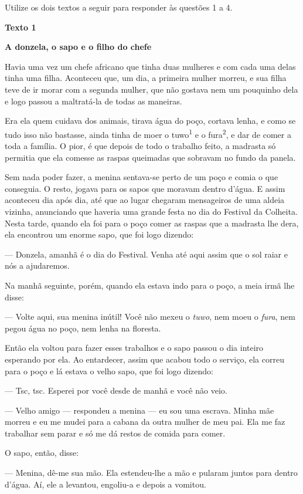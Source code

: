 Utilize os dois textos a seguir para responder às questões 1 a 4.

\textbf{Texto 1}

\textbf{A donzela, o sapo e o filho do chefe}

Havia uma vez um chefe africano que tinha duas mulheres e com cada uma
delas tinha uma filha. Aconteceu que, um dia, a primeira mulher morreu,
e sua filha teve de ir morar com a segunda mulher, que não gostava nem
um pouquinho dela e logo passou a maltratá-la de todas as maneiras.

Era ela quem cuidava dos animais, tirava água do poço, cortava lenha, e
como se tudo isso não bastasse, ainda tinha de moer o
tuwo\textsuperscript{1} e o fura\textsuperscript{2}, e dar de comer a
toda a família. O pior, é que depois de todo o trabalho feito, a
madrasta só permitia que ela comesse as raspas queimadas que sobravam no
fundo da panela.

Sem nada poder fazer, a menina sentava-se perto de um poço e comia o que
conseguia. O resto, jogava para os sapos que moravam dentro d'água. E
assim aconteceu dia após dia, até que ao lugar chegaram mensageiros de
uma aldeia vizinha, anunciando que haveria uma grande festa no dia do
Festival da Colheita. Nesta tarde, quando ela foi para o poço comer as
raspas que a madrasta lhe dera, ela encontrou um enorme sapo, que foi
logo dizendo:

--- Donzela, amanhã é o dia do Festival. Venha até aqui assim que o sol
raiar e nós a ajudaremos.

Na manhã seguinte, porém, quando ela estava indo para o poço, a meia
irmã lhe disse:

--- Volte aqui, sua menina inútil! Você não mexeu o \emph{tuwo}, nem moeu
o \emph{fura}, nem pegou água no poço, nem lenha na floresta.

Então ela voltou para fazer esses trabalhos e o sapo passou o dia
inteiro esperando por ela. Ao entardecer, assim que acabou todo o
serviço, ela correu para o poço e lá estava o velho sapo, que foi logo
dizendo:

--- Tsc, tsc. Esperei por você desde de manhã e você não veio.

--- Velho amigo --- respondeu a menina --- eu sou uma escrava. Minha mãe
morreu e eu me mudei para a cabana da outra mulher de meu pai. Ela me
faz trabalhar sem parar e só me dá restos de comida para comer.

O sapo, então, disse:

--- Menina, dê-me sua mão. Ela estendeu-lhe a mão e pularam juntos para
dentro d'água. Aí, ele a levantou, engoliu-a e depois a vomitou.

